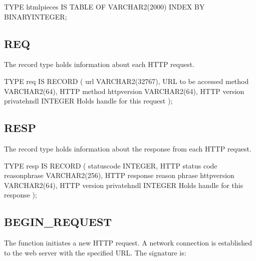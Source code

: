 \documentclass[letterpaper,10pt,english,openany,oneside]{sphinxmanual}
\begin{document}
%
\begin{sphinxVerbatim}[commandchars=\\\{\}]
TYPE html\PYGZus{}pieces IS TABLE OF VARCHAR2(2000) INDEX BY BINARY\PYGZus{}INTEGER;
\end{sphinxVerbatim}


\subsection{REQ}
\label{\detokenize{utl_http:req}}
The  record type holds information about each HTTP request.

%
\begin{sphinxVerbatim}[commandchars=\\\{\}]
TYPE req IS RECORD (
    url             VARCHAR2(32767),    \PYGZhy{}\PYGZhy{} URL to be accessed
    method          VARCHAR2(64),       \PYGZhy{}\PYGZhy{} HTTP method
    http\PYGZus{}version    VARCHAR2(64),       \PYGZhy{}\PYGZhy{} HTTP version
    private\PYGZus{}hndl    INTEGER             \PYGZhy{}\PYGZhy{} Holds handle for this request
);
\end{sphinxVerbatim}


\subsection{RESP}
\label{\detokenize{utl_http:resp}}
The  record type holds information about the response from each HTTP
request.

%
\begin{sphinxVerbatim}[commandchars=\\\{\}]
TYPE resp IS RECORD (
    status\PYGZus{}code     INTEGER,            \PYGZhy{}\PYGZhy{} HTTP status code
    reason\PYGZus{}phrase   VARCHAR2(256),      \PYGZhy{}\PYGZhy{} HTTP response reason phrase
    http\PYGZus{}version    VARCHAR2(64),       \PYGZhy{}\PYGZhy{} HTTP version
    private\PYGZus{}hndl    INTEGER             \PYGZhy{}\PYGZhy{} Holds handle for this response
);
\end{sphinxVerbatim}


\subsection{BEGIN\_REQUEST}
\label{\detokenize{utl_http:begin-request}}
The  function initiates a new HTTP request. A network
connection is established to the web server with the specified URL. The
signature is:
\begin{quote}

\begin{DUlineblock}{0em}
\item[] 
\item[] 
\item[] 
\end{DUlineblock}
\end{quote}
\end{document}
